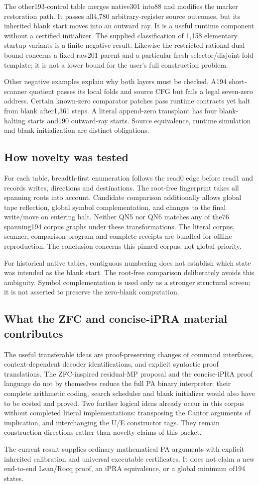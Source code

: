 The other193-control table merges native301 into88 and modifies the marker
restoration path. It passes all4,780 arbitrary-register source outcomes, but
its inherited blank start moves into an outward ray. It is a useful runtime
component without a certified initializer. The supplied classification of
1,158 elementary startup variants is a finite negative result. Likewise the
restricted rational-dual bound concerns a fixed raw201 parent and a particular
fresh-selector/disjoint-fold template; it is not a lower bound for the user's
full construction problem.

Other negative examples explain why both layers must be checked. A194
short-scanner quotient passes its local folds and source CFG but fails a legal
seven-zero address. Certain known-zero comparator patches pass runtime
contracts yet halt from blank after1,361 steps. A literal append-zero transplant
has four blank-halting starts and190 outward-ray starts. Source equivalence,
runtime simulation and blank initialization are distinct obligations.

\subsection{How novelty was tested}

For each table, breadth-first enumeration follows the read0 edge before read1
and records writes, directions and destinations. The root-free fingerprint
takes all spanning roots into account. Candidate comparison additionally
allows global tape reflection, global symbol complementation, and changes to
the final write/move on entering halt. Neither QN5 nor QN6 matches any of the76
spanning194 corpus graphs under these transformations. The literal corpus,
scanner, comparison program and complete receipts are bundled for offline
reproduction. The conclusion concerns this pinned corpus, not global priority.

For historical native tables, contiguous numbering does not establish which
state was intended as the blank start. The root-free comparison deliberately
avoids this ambiguity. Symbol complementation is used only as a stronger
structural screen; it is not asserted to preserve the zero-blank computation.

\subsection{What the ZFC and concise-iPRA material contributes}

The useful transferable ideas are proof-preserving changes of command
interfaces, context-dependent decoder identifications, and explicit syntactic
proof translations. The ZFC-inspired residual-MP proposal and the concise-iPRA
proof language do not by themselves reduce the full PA binary interpreter:
their complete arithmetic coding, search scheduler and blank initializer would
also have to be costed and proved. Two further logical ideas already occur in
this corpus without completed literal implementations: transposing the Cantor
arguments of implication, and interchanging the U/E constructor tags. They
remain construction directions rather than novelty claims of this packet.

The current result supplies ordinary mathematical PA arguments with explicit
inherited calibration and universal executable certificates. It does not
claim a new end-to-end Lean/Rocq proof, an iPRA equivalence, or a global minimum
of194 states.
